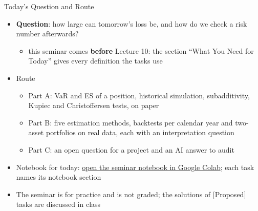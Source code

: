 \begin{frame}{Today's Question and Route}
\itemsize{\small}
\begin{itemize}
    \item \textbf{Question}: how large can tomorrow's loss be, and how do we check a risk number afterwards?
    \begin{itemize}
        \item this seminar comes \textbf{before} Lecture 10: the section ``What You Need for Today'' gives every definition the tasks use
    \end{itemize}
    \item Route
    \begin{itemize}
        \item Part A: VaR and ES of a position, historical simulation, subadditivity, Kupiec and Christoffersen tests, on paper
        \item Part B: five estimation methods, backtests per calendar year and two-asset portfolios on real data, each with an interpretation question
        \item Part C: an open question for a project and an AI answer to audit
    \end{itemize}
    \item Notebook for today: \href{\nb}{open the seminar notebook in Google Colab}; each task names its notebook section
    \item The seminar is for practice and is not graded; the solutions of [Proposed] tasks are discussed in class
\end{itemize}
\end{frame}

